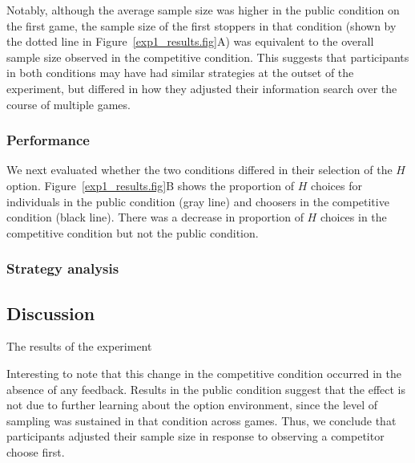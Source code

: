 \documentclass[11pt,jou]{apa6}
\begin{document}
Notably, although the average sample size was higher in the public condition on the first game, the sample size of the first stoppers in that condition (shown by the dotted line in Figure~\ref{exp1_results.fig}A) was equivalent to the overall sample size observed in the competitive condition.
This suggests that participants in both conditions may have had similar strategies at the outset of the experiment, but differed in how they adjusted their information search over the course of multiple games.




\subsubsection{Performance}

We next evaluated whether the two conditions differed in their selection of the $H$ option.
Figure~\ref{exp1_results.fig}B shows the proportion of $H$ choices for individuals in the public condition (gray line) and choosers in the competitive condition (black line).
There was a decrease in proportion of $H$ choices in the competitive condition but not the public condition.

\subsubsection{Strategy analysis}


\subsection{Discussion}

The results of the experiment 


Interesting to note that this change in the competitive condition occurred in the absence of any feedback.
Results in the public condition suggest that the effect is not due to further learning about the option environment, since the level of sampling was sustained in that condition across games.
Thus, we conclude that participants adjusted their sample size in response to observing a competitor choose first.
\end{document}
